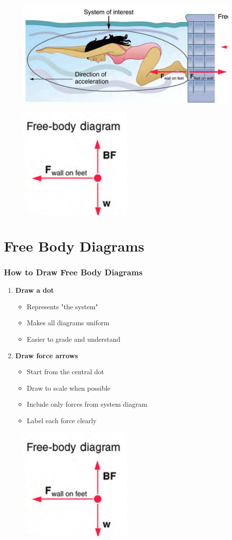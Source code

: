 \documentclass{beamer}
\begin{document}
\begin{frame}
\begin{figure}[H]
    \centering
    \includegraphics[width=0.5\linewidth]{CH4/Screenshot 2024-11-07 105535.png}
\end{figure}
\begin{figure}[H]
    \centering
    \includegraphics[width=0.3\linewidth]{CH4/Screenshot 2024-11-07 105554.png}
\end{figure}

\end{frame}

\section{Free Body Diagrams}

\begin{frame}
\frametitle{How to Draw Free Body Diagrams}
\begin{enumerate}
    \item \textbf{Draw a dot}
    \begin{itemize}
        \item Represents "the system"
        \item Makes all diagrams uniform
        \item Easier to grade and understand
    \end{itemize}
    \item \textbf{Draw force arrows}
    \begin{itemize}
        \item Start from the central dot
        \item Draw to scale when possible
        \item Include only forces from system diagram
        \item Label each force clearly
    \end{itemize}
\end{enumerate}
\begin{figure}
    \centering
    \includegraphics[width=0.2\linewidth]{CH4/Screenshot 2024-11-07 105554.png}
\end{figure}
\end{frame}
\end{document}
